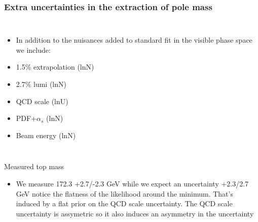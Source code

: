 \documentclass{beamer}
\begin{document}
\begin{frame}
\frametitle{Extra uncertainties in the extraction of pole mass}
\begin{columns}
\begin{itemize}
\small
\item In addition to the nuisances added to standard fit in the visible phase space we include:
\item 1.5\% extrapolation (lnN)
\item 2.7\% lumi (lnN)
\item QCD scale (lnU)
\item PDF+$\alpha_{s}$ (lnN)
\item Beam energy (lnN)
\end{itemize}
\end{columns}
\end{frame}
\begin{frame}{Measured top mass}

    \begin{center}


    \end{center}
  \begin{itemize}
    \scriptsize
    \item We measure 172.3 +2.7/-2.3 GeV while we expect an uncertainty +2.3/2.7 GeV
notice the flatness of the likelihood around the minimum. That's induced by a flat prior on the QCD scale uncertainty.
The QCD scale uncertainty is assymetric so it also induces an asymmetry in the uncertainty
    \end{itemize}
\end{frame}
\end{document}
